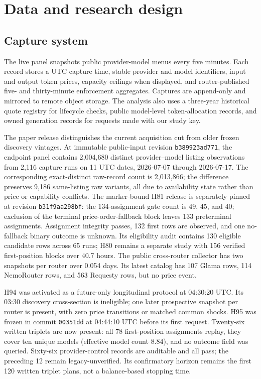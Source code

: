 \documentclass[11pt]{article}
\newcommand{\1}{\mathbf{1}}
\begin{document}
\section{Data and research design}
\label{sec:data}

\subsection{Capture system}

The live panel snapshots public provider-model menus every five minutes.  Each
record stores a UTC capture time, stable provider and model identifiers, input and
output token prices, capacity ceilings when displayed, and router-published
five- and thirty-minute enforcement aggregates.  Captures are append-only and
mirrored to remote object storage.  The analysis also uses a three-year historical
quote registry for lifecycle checks, public model-level token-allocation records,
and owned generation records for requests made with our study key.

The paper release distinguishes the current acquisition cut from older frozen
discovery vintages.  At immutable public-input revision
\texttt{b389923ad771}, the endpoint panel contains 2,004,680 distinct
provider--model listing observations from 2,116 capture runs on 11 UTC dates,
2026-07-07 through 2026-07-17.  The corresponding exact-distinct raw-record
count is 2,013,866; the difference preserves 9,186 same-listing raw variants,
all due to availability state rather than price or capability conflicts.  The
marker-bound H81 release is separately pinned at revision
\texttt{b31f9aa298bf}: the 134-assignment gate count is 49, 45, and 40; exclusion
of the terminal price-order-fallback block leaves 133 preterminal assignments.
Assignment integrity passes, 132 first rows are observed, and one no-fallback
binary outcome is unknown.  Its eligibility audit contains 130 eligible
candidate rows across 65 runs; H80 remains a separate study
with 156 verified first-position blocks over 40.7 hours.  The public cross-router
collector has two snapshots per router over 0.054 days.  Its latest catalog has
107 Glama rows, 114 NemoRouter rows, and 563 Requesty rows, but no price event.

H94 was activated as a future-only longitudinal protocol at 04:30:20 UTC.  Its
03:30 discovery cross-section is ineligible; one later prospective snapshot per
router is present, with zero price transitions or matched common shocks.  H95
was frozen in commit \texttt{00351dd} at 04:44:10 UTC before its first request.
Twenty-six written triplets are now present: all 78 first-position assignments
replay, they cover ten unique models (effective model count 8.84), and no outcome
field was queried.  Sixty-six provider-control records are auditable and all
pass; the preceding 12 remain legacy-unverified.  Its
confirmatory horizon remains the first 120 written
triplet plans, not a balance-based stopping time.
\end{document}
